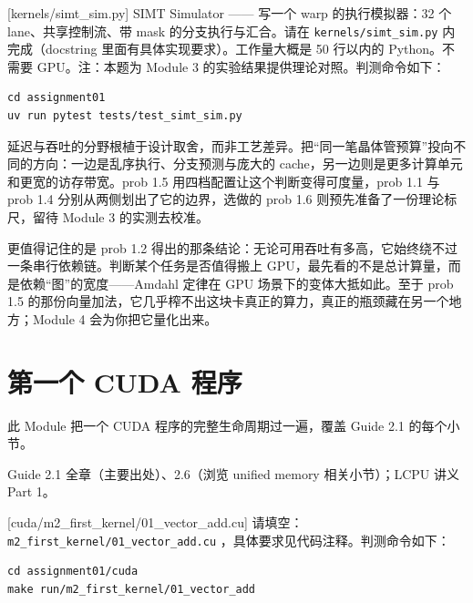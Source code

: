 \documentclass[11pt,a4paper,fontset=none]{ctexart}
\begin{document}

[kernels/simt\_sim.py]
SIMT Simulator —— 写一个 warp 的执行模拟器：32 个 lane、共享控制流、带 mask 的分支执行与汇合。请在 \texttt{kernels/simt\_sim.py} 内完成（docstring 里面有具体实现要求）。工作量大概是 50 行以内的 Python。不需要 GPU。注：本题为 Module 3 的实验结果提供理论对照。判测命令如下：

\begin{lstlisting}
cd assignment01
uv run pytest tests/test_simt_sim.py
\end{lstlisting}

\begin{lookback}
延迟与吞吐的分野根植于设计取舍，而非工艺差异。把“同一笔晶体管预算”投向不同的方向：一边是乱序执行、分支预测与庞大的 cache，另一边则是更多计算单元和更宽的访存带宽。prob 1.5 用四档配置让这个判断变得可度量，prob 1.1 与 prob 1.4 分别从两侧划出了它的边界，选做的 prob 1.6 则预先准备了一份理论标尺，留待 Module 3 的实测去校准。

更值得记住的是 prob 1.2 得出的那条结论：无论可用吞吐有多高，它始终绕不过一条串行依赖链。判断某个任务是否值得搬上 GPU，最先看的不是总计算量，而是依赖“图”的宽度——Amdahl 定律在 GPU 场景下的变体大抵如此。至于 prob 1.5 的那份向量加法，它几乎榨不出这块卡真正的算力，真正的瓶颈藏在另一个地方；Module 4 会为你把它量化出来。
\end{lookback}

\section{第一个 CUDA 程序}

此 Module 把一个 CUDA 程序的完整生命周期过一遍，覆盖 Guide 2.1 的每个小节。

\begin{reading}
Guide 2.1 全章（主要出处）、2.6（浏览 unified memory 相关小节）；LCPU 讲义 Part 1。
\end{reading}

[cuda/m2\_first\_kernel/01\_vector\_add.cu]
请填空：\texttt{m2\_first\_kernel/01\_vector\_add.cu} ，具体要求见代码注释。判测命令如下：

\begin{lstlisting}
cd assignment01/cuda
make run/m2_first_kernel/01_vector_add
\end{lstlisting}
\end{document}
